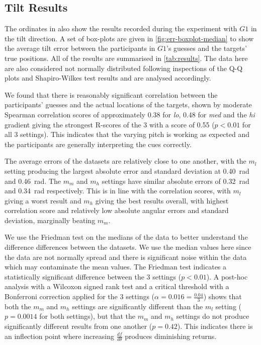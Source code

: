 \documentclass[sigconf, screen=true, anonymous=true]{acmart}
\begin{document}

\subsection{Tilt Results}\label{sec:tilt-results}

The ordinates in  also show the results recorded during the experiment with $G1$ in the tilt direction.
A set of box-plots are given in \cref{fig:err-boxplot-median} to show the average tilt error between the participants in $G1$'s guesses and the targets' true positions.
All of the results are summarised in \cref{tab:results}. 
The data here are also considered not normally distributed following inspections of the Q-Q plots and Shapiro-Wilkes test results and are analysed accordingly.

We found that there is reasonably significant correlation between the participants' guesses and the actual locations of the targets, shown by moderate Spearman correlation scores of approximately 0.38 for \emph{lo}, 0.48 for \emph{med} and the \emph{hi} gradient giving the strongest R-scores of the 3 with a score of 0.55 ($p < 0.01$ for all 3 settings).
This indicates that the varying pitch is working as expected and the participants are generally interpreting the cues correctly. 

The average errors of the datasets are relatively close to one another, with the $m_l$ setting producing the largest absolute error and standard deviation at \SI{0.40}{\radian} and \SI{0.46}{\radian}.
The $m_m$ and $m_h$ settings have similar absolute errors of \SI{0.32}{\radian} and \SI{0.34}{\radian} respectively.
This is in line with the correlation scores, with $m_l$ giving a worst result and $m_h$ giving the best results overall, with highest correlation score and relatively low absolute angular errors and standard deviation, marginally beating $m_m$. 

We use the Friedman test on the medians of the data to better understand the difference differences between the datasets.
We use the median values here since the data are not normally spread and there is significant noise within the data which may contaminate the mean values.
The Friedman test indicates a statistically significant difference between the 3 settings ($p < 0.01$).
A post-hoc analysis with a Wilcoxon signed rank test and a critical threshold with a Bonferroni correction applied for the 3 settings ($\alpha=0.016=\frac{0.04}{3}$) shows that both the $m_m$ and $m_h$ settings are significantly different than the $m_l$ setting ($p=0.0014$ for both settings), but that the $m_m$ and $m_h$ settings do not produce significantly different results from one another ($p=0.42$).
This indicates there is an inflection point where increasing $\frac{df}{d\theta}$ produces diminishing returns.
\end{document}
